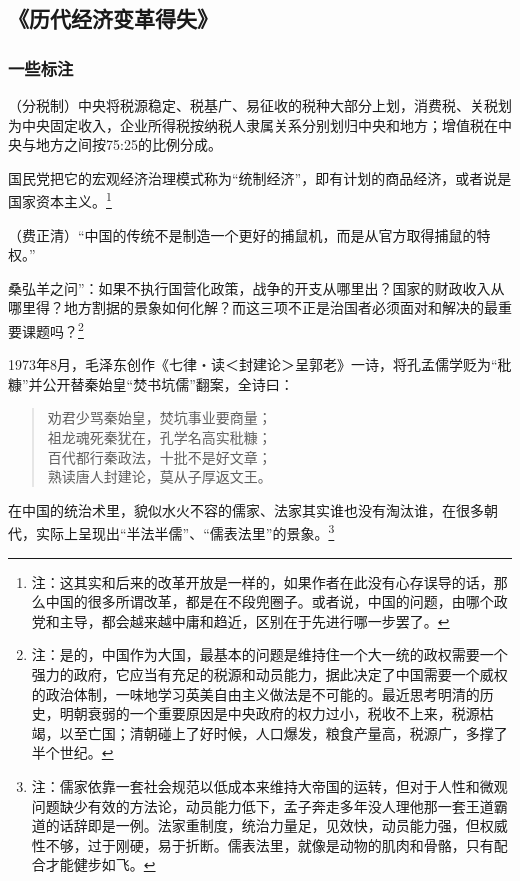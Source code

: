 \subsection{《历代经济变革得失》}

\subsubsection{一些标注}
（分税制）中央将税源稳定、税基广、易征收的税种大部分上划，消费税、关税划为中央固定收入，企业所得税按纳税人隶属关系分别划归中央和地方；增值税在中央与地方之间按75:25的比例分成。

国民党把它的宏观经济治理模式称为“统制经济”，即有计划的商品经济，或者说是国家资本主义。\footnote{注：这其实和后来的改革开放是一样的，如果作者在此没有心存误导的话，那么中国的很多所谓改革，都是在不段兜圈子。或者说，中国的问题，由哪个政党和主导，都会越来越中庸和趋近，区别在于先进行哪一步罢了。}

（费正清）“中国的传统不是制造一个更好的捕鼠机，而是从官方取得捕鼠的特权。”

桑弘羊之问”：如果不执行国营化政策，战争的开支从哪里出？国家的财政收入从哪里得？地方割据的景象如何化解？而这三项不正是治国者必须面对和解决的最重要课题吗？\footnote{注：是的，中国作为大国，最基本的问题是维持住一个大一统的政权需要一个强力的政府，它应当有充足的税源和动员能力，据此决定了中国需要一个威权的政治体制，一味地学习英美自由主义做法是不可能的。最近思考明清的历史，明朝衰弱的一个重要原因是中央政府的权力过小，税收不上来，税源枯竭，以至亡国；清朝碰上了好时候，人口爆发，粮食产量高，税源广，多撑了半个世纪。}

1973年8月，毛泽东创作《七律・读＜封建论＞呈郭老》一诗，将孔孟儒学贬为“秕糠”并公开替秦始皇“焚书坑儒”翻案，全诗曰：
\begin{verse}
\fangsong \centering
劝君少骂秦始皇，焚坑事业要商量；\\ 
祖龙魂死秦犹在，孔学名高实秕糠； \\
百代都行秦政法，十批不是好文章； \\
熟读唐人封建论，莫从子厚返文王。
\end{verse}

在中国的统治术里，貌似水火不容的儒家、法家其实谁也没有淘汰谁，在很多朝代，实际上呈现出“半法半儒”、“儒表法里”的景象。\footnote{注：儒家依靠一套社会规范以低成本来维持大帝国的运转，但对于人性和微观问题缺少有效的方法论，动员能力低下，孟子奔走多年没人理他那一套王道霸道的话辞即是一例。法家重制度，统治力量足，见效快，动员能力强，但权威性不够，过于刚硬，易于折断。儒表法里，就像是动物的肌肉和骨骼，只有配合才能健步如飞。}

